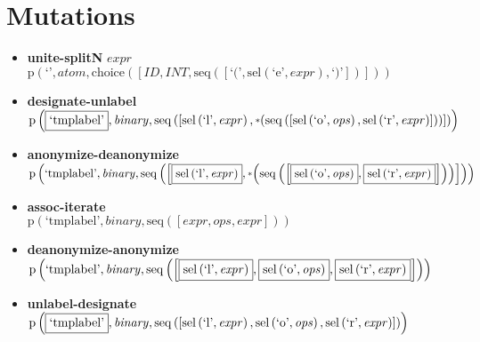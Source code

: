 \section{Mutations}
{\footnotesize\begin{itemize}
\item \textbf{unite-splitN} $expr$ \\$\mathrm{p}\left(\text{`'},\mathit{atom},\mathrm{choice}\left(\left[\mathit{ID}, \mathit{INT}, \mathrm{seq}\left(\left[\text{`('}, \mathrm{sel}\left(\text{`e'},\mathit{expr}\right), \text{`)'}\right]\right)\right]\right)\right)$
\item \textbf{designate-unlabel}\\$\mathrm{p}\left(\fbox{\text{`tmplabel'}},\mathit{binary},\mathrm{seq}\left(\left[\mathrm{sel}\left(\text{`l'},\mathit{expr}\right), \star \left(\mathrm{seq}\left(\left[\mathrm{sel}\left(\text{`o'},\mathit{ops}\right), \mathrm{sel}\left(\text{`r'},\mathit{expr}\right)\right]\right)\right)\right]\right)\right)$
\item \textbf{anonymize-deanonymize}\\$\mathrm{p}\left(\text{`tmplabel'},\mathit{binary},\mathrm{seq}\left(\left[\fbox{$\mathrm{sel}\left(\text{`l'},\mathit{expr}\right)$}, \star \left(\mathrm{seq}\left(\left[\fbox{$\mathrm{sel}\left(\text{`o'},\mathit{ops}\right)$}, \fbox{$\mathrm{sel}\left(\text{`r'},\mathit{expr}\right)$}\right]\right)\right)\right]\right)\right)$
\item \textbf{assoc-iterate}\\$\mathrm{p}\left(\text{`tmplabel'},\mathit{binary},\mathrm{seq}\left(\left[\mathit{expr}, \mathit{ops}, \mathit{expr}\right]\right)\right)$
\item \textbf{deanonymize-anonymize}\\$\mathrm{p}\left(\text{`tmplabel'},\mathit{binary},\mathrm{seq}\left(\left[\fbox{$\mathrm{sel}\left(\text{`l'},\mathit{expr}\right)$}, \fbox{$\mathrm{sel}\left(\text{`o'},\mathit{ops}\right)$}, \fbox{$\mathrm{sel}\left(\text{`r'},\mathit{expr}\right)$}\right]\right)\right)$
\item \textbf{unlabel-designate}\\$\mathrm{p}\left(\fbox{\text{`tmplabel'}},\mathit{binary},\mathrm{seq}\left(\left[\mathrm{sel}\left(\text{`l'},\mathit{expr}\right), \mathrm{sel}\left(\text{`o'},\mathit{ops}\right), \mathrm{sel}\left(\text{`r'},\mathit{expr}\right)\right]\right)\right)$
\end{itemize}}

